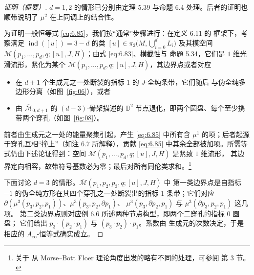 

\begin{proof}[证明（概要）]
$d=1,2$ 的情形已分别由定理 5.39 与命题 6.4 处理。后者的证明也顺带说明了
$\mu^2$ 在上同调上的结合性。

为证明一般恒等式 \eqref{eq:6.85}，我们按“通常”步骤进行：在定义 6.11 的
框架下，考察满足 $\operatorname{ind}([u])=3-d$ 的类
$[u]\in\pi_2\bigl(M,\bigcup_{i=0}^d L_i\bigr)$ 及其模空间
$\mathcal M(p_1,\dots,p_d,q;[u],J,H)$；由式 \eqref{eq:6.83}、横截性与
命题 5.34，它们是 $1$ 维光滑流形，紧化为某个
$\overline{\mathcal M}(p_1,\dots,p_d,q;[u],J,H)$，其边界点或者对应
\begin{itemize}
  \item 在 $d+1$ 个生成元之一处断裂的指标 $1$ 的 $J$-全纯条带，它们随后
  与伪全纯多边形分离（如图~\ref{fig:06}），或者
  \item 由 $\overline{\mathcal M}_{0,d+1}$ 的 $(d-3)$-骨架描述的
  $\mathbb D^2$ 节点退化，即两个圆盘、每个至少携带两个穿孔（如图~\ref{fig:08}）。
\end{itemize}
前者由生成元之一处的能量聚集引起，产生 \eqref{eq:6.85} 中所有含 $\mu^1$
的项；后者起源于穿孔互相“撞上”（如注 6.7 所解释），贡献
\eqref{eq:6.85} 中其余全部被加项。所需等式仍由下述论证得到：空间
$\overline{\mathcal M}(p_1,\dots,p_d,q;[u],J,H)$ 是紧致 $1$ 维流形，
其边界定向相容，故带符号基数必为零；最后对所有同伦类求和。\footnote{关于
从 Morse--Bott Floer 理论角度出发的略有不同的处理，可参阅 \cite{Fuk02a}
第 3 节。}

下面讨论 $d=3$ 的情形。$\overline{\mathcal M}(p_1,p_2,p_3,q;[u],J,H)$ 中
第一类边界点是自指标 $-1$ 的伪全纯方形在其四个穿孔之一处断裂出的指标 $1$
条带；它们对应
$\partial(\mu^3(p_3,p_2,p_1))$、$\mu^3(p_3,p_2,\partial p_1)$、
$\mu^3(p_3,\partial p_2,p_1)$ 与 $\mu^3(\partial p_3,p_2,p_1)$ 这几项。
第二类边界点则对应例 6.6 所述两种节点构型，即两个二穿孔的指标 $0$ 圆盘；
它们给出 $p_3\cdot(p_2\cdot p_1)$ 与 $(p_3\cdot p_2)\cdot p_1$。系数由
生成元的次数决定，于是相应的 $A_\infty$-恒等式确实成立。
\end{proof}

